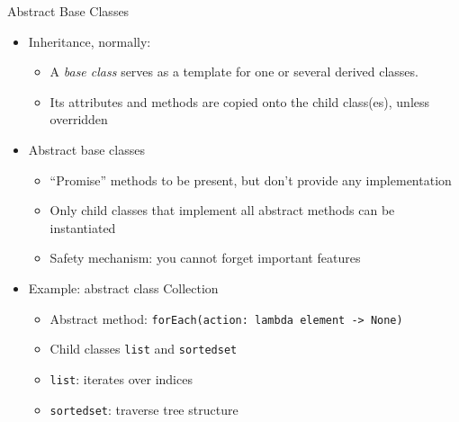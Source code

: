 \begin{frame}{Abstract Base Classes}
%
\begin{itemize}
\item Inheritance, normally:
	\begin{itemize}
	\item A \emph{base class} serves as a template for one or several derived classes.
	\item Its attributes and methods are copied onto the child class(es), unless overridden
	\end{itemize}
\item Abstract base classes
	\begin{itemize}
	\item \enquote{Promise} methods to be present, but don't provide any implementation
	\item Only child classes that implement all abstract methods can be instantiated
	\item[\Thus] Safety mechanism: you cannot forget important features
	\end{itemize}
\item Example: abstract class Collection
	\begin{itemize}
	\item Abstract method: \texttt{forEach(action: lambda element -> None)}
	\item Child classes \texttt{list} and \texttt{sortedset}
	\item \texttt{list}: iterates over indices
	\item \texttt{sortedset}: traverse tree structure
	\end{itemize}
\end{itemize}
%
\end{frame}


